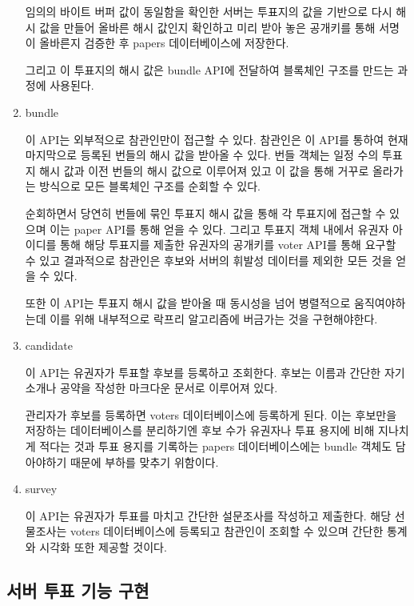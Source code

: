 \documentclass[10pt,a4paper,left=15mm,right=15mm,top=20mm,bottom=20mm]{article}
\begin{document}
\begin{enumerate}
    임의의 바이트 버퍼 값이 동일함을 확인한 서버는 투표지의 값을 기반으로 다시 해시 값을 만들어 올바른 해시 값인지 확인하고 미리 받아 놓은 공개키를 통해 서명이 올바른지 검증한 후 papers 데이터베이스에 저장한다.

    그리고 이 투표지의 해시 값은 bundle API에 전달하여 블록체인 구조를 만드는 과정에 사용된다.

    \item bundle
    
    이 API는 외부적으로 참관인만이 접근할 수 있다. 참관인은 이 API를 통하여 현재 마지막으로 등록된 번들의 해시 값을 받아올 수 있다. 번들 객체는 일정 수의 투표지 해시 값과 이전 번들의 해시 값으로 이루어져 있고 이 값을 통해 거꾸로 올라가는 방식으로 모든 블록체인 구조를 순회할 수 있다.

    순회하면서 당연히 번들에 묶인 투표지 해시 값을 통해 각 투표지에 접근할 수 있으며 이는 paper API를 통해 얻을 수 있다. 그리고 투표지 객체 내에서 유권자 아이디를 통해 해당 투표지를 제출한 유권자의 공개키를 voter API를 통해 요구할 수 있고 결과적으로 참관인은 후보와 서버의 휘발성 데이터를 제외한 모든 것을 얻을 수 있다.

    또한 이 API는 투표지 해시 값을 받아올 때 동시성을 넘어 병렬적으로 움직여야하는데 이를 위해 내부적으로 락프리 알고리즘에 버금가는 것을 구현해야한다.

    \item candidate
    
    이 API는 유권자가 투표할 후보를 등록하고 조회한다. 후보는 이름과 간단한 자기 소개나 공약을 작성한 마크다운 문서로 이루어져 있다.
    
    관리자가 후보를 등록하면 voters 데이터베이스에 등록하게 된다. 이는 후보만을 저장하는 데이터베이스를 분리하기엔 후보 수가 유권자나 투표 용지에 비해 지나치게 적다는 것과 투표 용지를 기록하는 papers 데이터베이스에는 bundle 객체도 담아야하기 때문에 부하를 맞추기 위함이다.

    \item survey
    
    이 API는 유권자가 투표를 마치고 간단한 설문조사를 작성하고 제출한다. 해당 선물조사는 voters 데이터베이스에 등록되고 참관인이 조회할 수 있으며 간단한 통계와 시각화 또한 제공할 것이다.

\end{enumerate}

\subsection{서버 투표 기능 구현}
\end{document}
